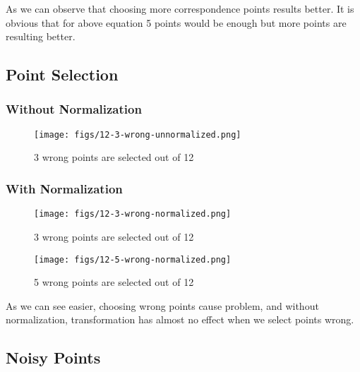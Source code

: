 \documentclass[12pt]{article}
\begin{document}
As we can observe that choosing more correspondence points results better. It is obvious that for above equation 5 points would be enough but more points are resulting better.

\subsection{Point Selection}
\subsubsection{Without Normalization}
\begin{figure}[H]
    \centering
    \texttt{[image: figs/12-3-wrong-unnormalized.png]}
    \caption{3 wrong points are selected out of 12}
    \label{fig:3-wrong-unnormalized}
\end{figure}

\subsubsection{With Normalization}
\begin{figure}[H]
    \centering
    \texttt{[image: figs/12-3-wrong-normalized.png]}
    \caption{3 wrong points are selected out of 12}
    \label{fig:3-wrong-normalized}
\end{figure}

\begin{figure}[H]
    \centering
    \texttt{[image: figs/12-5-wrong-normalized.png]}
    \caption{5 wrong points are selected out of 12}
    \label{fig:5-wrong-normalized}
\end{figure}

As we can see easier, choosing wrong points cause problem, and without normalization, transformation has almost no effect when we select points wrong.

\subsection{Noisy Points}
\end{document}
